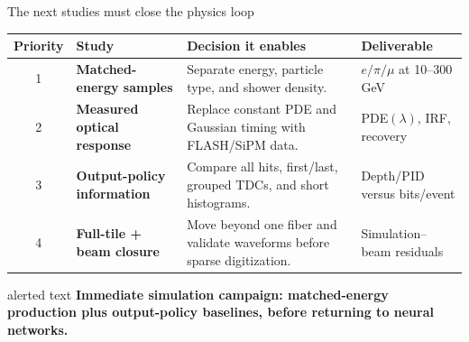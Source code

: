\documentclass[10pt,aspectratio=169,t]{beamer}
\begin{document}
\begin{frame}{The next studies must close the physics loop}
  \scriptsize
  \renewcommand{\arraystretch}{1.18}
  \begin{tabularx}{\textwidth}{c >{\bfseries}p{3.1cm} X >{\raggedright\arraybackslash}p{2.2cm}}
    \toprule
    Priority & Study & Decision it enables & Deliverable \\
    \midrule
    1 & Matched-energy samples & Separate energy, particle type, and shower density. & $e/\pi/\mu$ at 10--300 GeV \\
    2 & Measured optical response & Replace constant PDE and Gaussian timing with FLASH/SiPM data. & PDE$(\lambda)$, IRF, recovery \\
    3 & Output-policy information & Compare all hits, first/last, grouped TDCs, and short histograms. & Depth/PID versus bits/event \\
    4 & Full-tile + beam closure & Move beyond one fiber and validate waveforms before sparse digitization. & Simulation--beam residuals \\
    \bottomrule
  \end{tabularx}
  \vspace{0.20cm}
  \begin{beamercolorbox}[rounded=true,sep=0.16cm]{alerted text}
    \centering\bfseries Immediate simulation campaign: matched-energy production plus output-policy baselines, before returning to neural networks.
  \end{beamercolorbox}
\end{frame}
\end{document}

